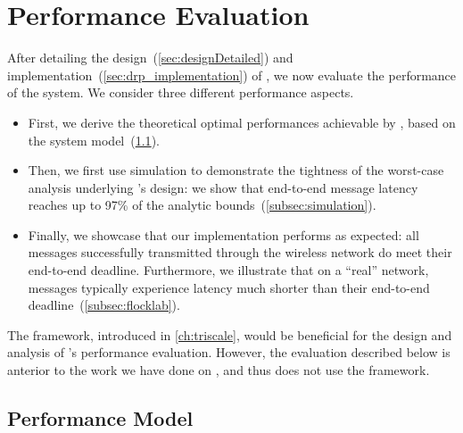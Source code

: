 
\section{Performance Evaluation}
\label{sec:drp_evaluation}

After detailing the design~(\cref{sec:designDetailed}) and implementation~(\cref{sec:drp_implementation}) of \DRP, we now evaluate the performance of the system. We consider three different performance aspects.

\begin{itemize}
	\item
	First, we derive the theoretical optimal performances achievable by \DRP, based on the system model~(\cref{subsec:perf_model}).

	\item
	Then, we first use simulation to demonstrate the tightness of the worst-case analysis underlying \DRP's design: we show that end-to-end message latency reaches up to 97\% of the analytic bounds~(\cref{subsec:simulation}).

\pagebreak

	\item
	Finally, we showcase that our \DRP implementation performs as expected: all messages successfully transmitted through the wireless network do meet their end-to-end deadline. Furthermore, we illustrate that on a ``real'' network, messages typically experience latency much shorter than their end-to-end deadline~(\cref{subsec:flocklab}).
\end{itemize}


\begin{remark}
	The \triscale framework, introduced in \cref{ch:triscale}, would be beneficial for the design and analysis of \DRP's performance evaluation.
	However, the evaluation described below is anterior to the work we have done on \triscale, and thus does not use the framework.
\end{remark}


\subsection{Performance Model}
\label{subsec:perf_model}

